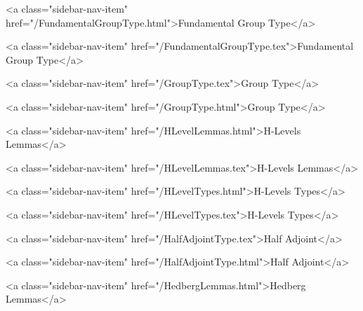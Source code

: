       
    
      
        
          <a class="sidebar-nav-item" href="/FundamentalGroupType.html">Fundamental Group Type</a>
        
      
    
      
        
          <a class="sidebar-nav-item" href="/FundamentalGroupType.tex">Fundamental Group Type</a>
        
      
    
      
        
          <a class="sidebar-nav-item" href="/GroupType.tex">Group Type</a>
        
      
    
      
        
          <a class="sidebar-nav-item" href="/GroupType.html">Group Type</a>
        
      
    
      
        
          <a class="sidebar-nav-item" href="/HLevelLemmas.html">H-Levels Lemmas</a>
        
      
    
      
        
          <a class="sidebar-nav-item" href="/HLevelLemmas.tex">H-Levels Lemmas</a>
        
      
    
      
        
          <a class="sidebar-nav-item" href="/HLevelTypes.html">H-Levels Types</a>
        
      
    
      
        
          <a class="sidebar-nav-item" href="/HLevelTypes.tex">H-Levels Types</a>
        
      
    
      
        
          <a class="sidebar-nav-item" href="/HalfAdjointType.tex">Half Adjoint</a>
        
      
    
      
        
          <a class="sidebar-nav-item" href="/HalfAdjointType.html">Half Adjoint</a>
        
      
    
      
        
          <a class="sidebar-nav-item" href="/HedbergLemmas.html">Hedberg Lemmas</a>
        
